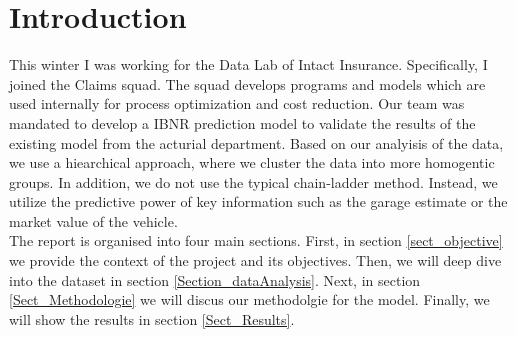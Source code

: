 \section{Introduction}
This winter I was working for the Data Lab of Intact Insurance. Specifically, I joined the Claims squad. The squad develops programs and models which are used internally for process optimization and cost reduction. Our team was mandated to develop a IBNR prediction model to validate the results of the existing model from the acturial department. Based on our analyisis of the data, we use a hiearchical approach, where we cluster the data into more homogentic groups. In addition, we do not use the typical chain-ladder method. Instead, we utilize the predictive power of key information such as the garage estimate or the market value of the vehicle. \\
The report is organised into four main sections. First, in section \ref{sect_objective} we provide the context of the project and its objectives. Then, we will deep dive into the dataset in section \ref{Section_dataAnalysis}. Next, in section \ref{Sect_Methodologie} we will discus our methodolgie for the model. Finally, we will show the results in section \ref{Sect_Results}.

	